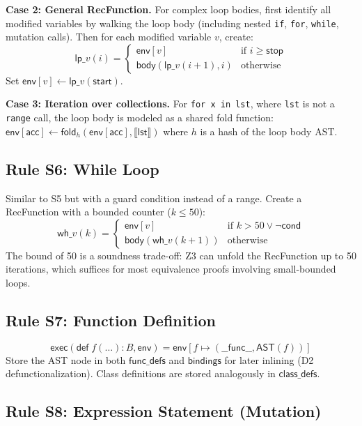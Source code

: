 \documentclass[11pt,a4paper]{report}
\theoremstyle{definition}
\theoremstyle{plain}
\newcommand{\den}[1]{\llbracket #1 \rrbracket}
\begin{document}
\textbf{Case 2: General RecFunction.}  For complex loop bodies,
first identify all modified variables by walking the loop body
(including nested \texttt{if}, \texttt{for}, \texttt{while}, mutation
calls).  Then for each modified variable $v$, create:
\[
  \mathsf{lp\_}v(i) = \begin{cases}
    \mathsf{env}[v] & \text{if } i \geq \mathsf{stop} \\
    \mathsf{body}(\mathsf{lp\_}v(i+1), i) & \text{otherwise}
  \end{cases}
\]
Set $\mathsf{env}[v] \leftarrow \mathsf{lp\_}v(\mathsf{start})$.

\textbf{Case 3: Iteration over collections.}
For \texttt{for x in lst}, where \texttt{lst} is not a \texttt{range}
call, the loop body is modeled as a shared fold function:
$\mathsf{env}[\mathsf{acc}] \leftarrow
\mathsf{fold}_{h}(\mathsf{env}[\mathsf{acc}], \den{\mathsf{lst}})$
where $h$ is a hash of the loop body AST.

\subsection{Rule S6: While Loop}

Similar to S5 but with a guard condition instead of a range.
Create a RecFunction with a bounded counter ($k \leq 50$):
\[
  \mathsf{wh\_}v(k) = \begin{cases}
    \mathsf{env}[v] & \text{if } k > 50 \lor
      \lnot\mathsf{cond} \\
    \mathsf{body}(\mathsf{wh\_}v(k+1)) & \text{otherwise}
  \end{cases}
\]
The bound of 50 is a soundness trade-off: Z3 can unfold the
RecFunction up to 50 iterations, which suffices for most
equivalence proofs involving small-bounded loops.

\subsection{Rule S7: Function Definition}
\[
  \mathsf{exec}(\mathsf{def}\; f(\ldots): B, \mathsf{env}) =
    \mathsf{env}[f \mapsto (\mathsf{\_\_func\_\_}, \mathsf{AST}(f))]
\]
Store the AST node in both $\mathsf{func\_defs}$ and
$\mathsf{bindings}$ for later inlining (D2 defunctionalization).
Class definitions are stored analogously in $\mathsf{class\_defs}$.

\subsection{Rule S8: Expression Statement (Mutation)}
\end{document}
